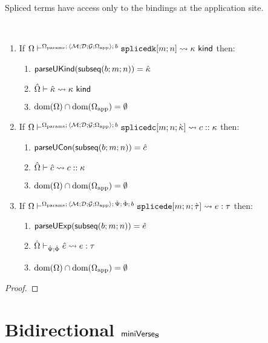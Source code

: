 Spliced terms have access only to the bindings at the application site.
\begingroup
\begin{theorem}
\label{thm:petsm-shadowing-prohibition}
~
\begin{enumerate}
\item If $\Omega \vdash^{\Omega_\text{params};\,\langle \mathcal{M}; \mathcal{D}; \mathcal{G}; \Omega_\text{app} \rangle;\,b} \texttt{splicedk}[m; n] \leadsto \kappa~\mathsf{kind}$ then:
  \begin{enumerate}
    \item $\mathsf{parseUKind}(\mathsf{subseq}(b; m; n))={\hat\kappa}$
    \item ${\hat\Omega} \vdash {\hat\kappa} \leadsto \kappa~\mathsf{kind}$
    \item $\text{dom}(\Omega) \cap \text{dom}(\Omega_\text{app}) = \emptyset$
  \end{enumerate}
\item If $\Omega \vdash^{\Omega_\text{params};\,\langle \mathcal{M}; \mathcal{D}; \mathcal{G}; \Omega_\text{app} \rangle;\,b} \texttt{splicedc}[m; n; {\grave\kappa}] \leadsto c :: \kappa$ then:
  \begin{enumerate}
    \item $\mathsf{parseUCon}(\mathsf{subseq}(b; m; n))={\hat c}$
    \item ${\hat\Omega} \vdash {\hat c} \leadsto c :: \kappa$
    \item $\text{dom}(\Omega) \cap \text{dom}(\Omega_\text{app}) = \emptyset$
  \end{enumerate}
\item If $\Omega \vdash^{\Omega_\text{params};\,\langle \mathcal{M}; \mathcal{D}; \mathcal{G}; \Omega_\text{app} \rangle;\,\hat{\Psi};\,\hat\Phi;\,b} \texttt{splicede}[m; n; \grave{\tau}] \leadsto e : \tau$ then:
  \begin{enumerate}
    \item $\mathsf{parseUExp}(\mathsf{subseq}(b; m; n))={\hat e}$
    \item ${\hat\Omega} \vdash_{\hat{\Psi}; \hat\Phi} {\hat e} \leadsto e : \tau$
    \item $\text{dom}(\Omega) \cap \text{dom}(\Omega_\text{app}) = \emptyset$
  \end{enumerate}
\end{enumerate}
\end{theorem}
\begin{proof}  \end{proof}

\chapter{Bidirectional $\mathsf{miniVerse}_\textbf{S}$}\label{appendix:simple-implicits}

